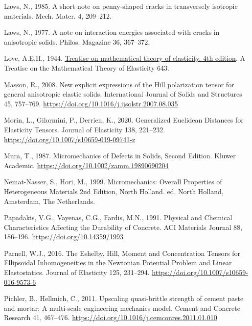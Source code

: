 \documentclass[
  a4paper,
  numbers=noendperiod,
  DIV=12]{scrreprt}
\newlength{\cslhangindent}
\newenvironment{CSLReferences}[2] %
 {\begin{list}{}{%
  \setlength{\itemindent}{0pt}
  \setlength{\leftmargin}{0pt}
  \setlength{\parsep}{0pt}
  \ifodd #1
   \setlength{\leftmargin}{\cslhangindent}
   \setlength{\itemindent}{-1\cslhangindent}
  \fi
  \setlength{\itemsep}{#2\baselineskip}}}
 {\end{list}}
\begin{document}
\begin{CSLReferences}{1}{0}
Laws, N., 1985. A short note on penny-shaped cracks in transversely
isotropic materials. Mech. Mater. 4, 209--212.

Laws, N., 1977. A note on interaction energies associated with cracks in
anisotropic solids. Philos. Magazine 36, 367--372.

Love, A.E.H., 1944.
\href{https://archive.org/details/atreatiseonmath01lovegoog}{Treatise on
mathematical theory of elasticity. 4th edition}. A Treatise on the
Mathematical Theory of Elasticity 643.

Masson, R., 2008. New explicit expressions of the {Hill} polarization
tensor for general anisotropic elastic solids. International Journal of
Solids and Structures 45, 757--769.
\url{https://doi.org/10.1016/j.ijsolstr.2007.08.035}

Morin, L., Gilormini, P., Derrien, K., 2020. Generalized {Euclidean
Distances} for {Elasticity Tensors}. Journal of Elasticity 138,
221--232. \url{https://doi.org/10.1007/s10659-019-09741-z}

Mura, T., 1987. Micromechanics of {Defects} in {Solids}, {Second
Edition}. Kluwer Academic.
\url{https://doi.org/10.1002/zamm.19890690204}

Nemat-Nasser, S., Hori, M., 1999. Micromechanics: {Overall Properties}
of {Heterogeneous Materials} 2nd {Edition}, North Holland. ed. North
Holland, Amsterdam, The Netherlands.

Papadakis, V.G., Vayenas, C.G., Fardis, M.N., 1991. Physical and
{Chemical Characteristics Affecting} the {Durability} of {Concrete}. ACI
Materials Journal 88, 186--196. \url{https://doi.org/10.14359/1993}

Parnell, W.J., 2016. The {Eshelby}, {Hill}, {Moment} and {Concentration
Tensors} for {Ellipsoidal Inhomogeneities} in the {Newtonian Potential
Problem} and {Linear Elastostatics}. Journal of Elasticity 125,
231--294. \url{https://doi.org/10.1007/s10659-016-9573-6}

Pichler, B., Hellmich, C., 2011. Upscaling quasi-brittle strength of
cement paste and mortar: {A} multi-scale engineering mechanics model.
Cement and Concrete Research 41, 467--476.
\url{https://doi.org/10.1016/j.cemconres.2011.01.010}


\end{CSLReferences}
\end{document}
